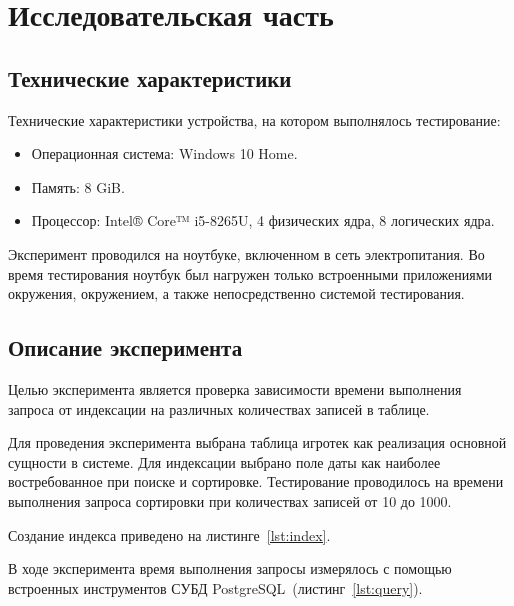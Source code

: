\chapter{\label{research}Исследовательская часть}

\section{Технические характеристики}

Технические характеристики устройства, на котором выполнялось тестирование:

\begin{itemize}
	\item Операционная система: Windows 10 Home.
	\item Память: 8 GiB.
    \item Процессор: Intel® Core™ i5-8265U, 4 физических ядра, 8 логических
        ядра.
\end{itemize}

Эксперимент проводился на ноутбуке, включенном в сеть электропитания. Во
время тестирования ноутбук был нагружен только встроенными приложениями
окружения, окружением, а также непосредственно системой тестирования.

\section{Описание эксперимента}

Целью эксперимента является проверка зависимости времени выполнения запроса от
индексации на различных количествах записей в таблице.

Для проведения эксперимента выбрана таблица игротек как реализация основной
сущности в системе. Для индексации выбрано поле даты как наиболее
востребованное при поиске и сортировке. Тестирование проводилось на времени
выполнения запроса сортировки при количествах записей от 10 до 1000.

Создание индекса приведено на листинге~\ref{lst:index}.

{
\captionsetup{format=hang,justification=raggedright,
              singlelinecheck=off,width=16cm}
}

В ходе эксперимента время выполнения запросы измерялось с помощью встроенных
инструментов СУБД PostgreSQL~(листинг~\ref{lst:query}).

{
\captionsetup{format=hang,justification=raggedright,
              singlelinecheck=off,width=16cm}
}

